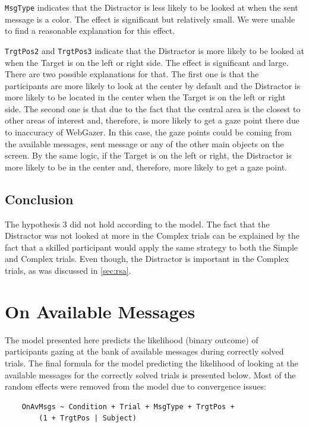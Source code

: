 \texttt{MsgType} indicates that the Distractor is less likely to be looked at when the sent message is a color. The effect is significant but relatively small. We were unable to find a reasonable explanation for this effect.

\texttt{TrgtPos2} and \texttt{TrgtPos3} indicate that the Distractor is more likely to be looked at when the Target is on the left or right side. The effect is significant and large. There are two possible explanations for that. The first one is that the participants are more likely to look at the center by default and the Distractor is more likely to be located in the center when the Target is on the left or right side. The second one is that due to the fact that the central area is the closest to other areas of interest and, therefore, is more likely to get a gaze point there due to inaccuracy of WebGazer. In this case, the gaze points could be coming from the available messages, sent message or any of the other main objects on the screen. By the same logic, if the Target is on the left or right, the Distractor is more likely to be in the center and, therefore, more likely to get a gaze point.

\subsection*{Conclusion}
\label{sec:ondist_conclusion}
The hypothesis 3 did not hold according to the model. The fact that the Distractor was not looked at more in the Complex trials can be explained by the fact that a skilled participant would apply the same strategy to both the Simple and Complex trials. Even though, the Distractor is important in the Complex trials, as was discussed in \autoref{sec:rsa}.














\section{On Available Messages}
\label{sec:available_model}

The model presented here predicts the likelihood (binary outcome) of participants gazing at the bank of available messages during correctly solved trials. The final formula for the model predicting the likelihood of looking at the available messages for the correctly solved trials is presented below. Most of the random effects were removed from the model due to convergence issues:
\begin{verbatim}
    OnAvMsgs ~ Condition + Trial + MsgType + TrgtPos +
        (1 + TrgtPos | Subject)
\end{verbatim}

